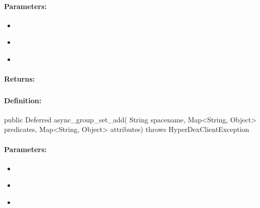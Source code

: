 \paragraph{Parameters:}
\begin{itemize}[noitemsep]
\item {}\\

\item {}\\

\item {}\\

\end{itemize}

\paragraph{Returns:}


\pagebreak
\subsubsection{}
\label{api:java:async_group_set_add}


\paragraph{Definition:}
\begin{javacode}
public Deferred async_group_set_add(
        String spacename,
        Map<String, Object> predicates,
        Map<String, Object> attributes) throws HyperDexClientException
\end{javacode}

\paragraph{Parameters:}
\begin{itemize}[noitemsep]
\item {}\\

\item {}\\

\item {}\\

\end{itemize}

